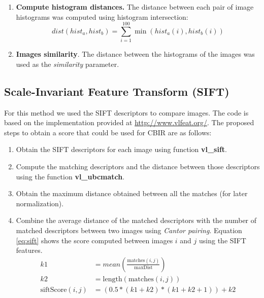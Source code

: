 \documentclass[a4paper,12pt]{article}
\begin{document}
\begin{enumerate}
\begin{figure}[h]
            \label{fig:spechist}
        \end{figure}
    \item \textbf{Compute histogram distances.} The distance between
        each pair of image histograms was computed using histogram intersection:
        \begin{equation}
            dist(hist_a,hist_b) = \sum_{i=1}^{100} \min( hist_a(i), hist_b(i))
        \end{equation}
    \item \textbf{Images similarity}. The distance between the histograms
        of the images was used as the \emph{similarity} parameter. 
\end{enumerate}

\subsection{Scale-Invariant Feature Transform (SIFT)}
For this method we used the SIFT descriptors to compare images. The code is based on  
the implementation provided at \href{http://www.vlfeat.org/}{http://www.vlfeat.org/}. The proposed steps
to obtain a score that could be used for CBIR are as follows:

\begin{enumerate}
    \item Obtain the SIFT descriptors for each image using function \textbf{vl\_sift}. 
    \item Compute the matching descriptors and the distance between those descriptors using
        the function \textbf{vl\_ubcmatch}.
    \item Obtain the maximum distance obtained between all the matches (for later normalization).
    \item Combine the average distance of the matched descriptors with the 
        number of matched descriptors between two images using \emph{Cantor pairing}. Equation \ref{eq:sift}
        shows the score computed between images $i$ and $j$ using the SIFT features.
        \begin{equation}
            \begin{split}
                k1 & = mean( \frac{\text{matches}(i,j)}{\text{maxDist}})\\
                k2 & = \text{length}(\text{matches}(i,j))\\
                \text{siftScore}(i,j) & =  (0.5*(k1+k2)*(k1+k2+1))+k2
            \end{split}
            \label{eq:sift}
        \end{equation}
\end{enumerate}
\end{document}

